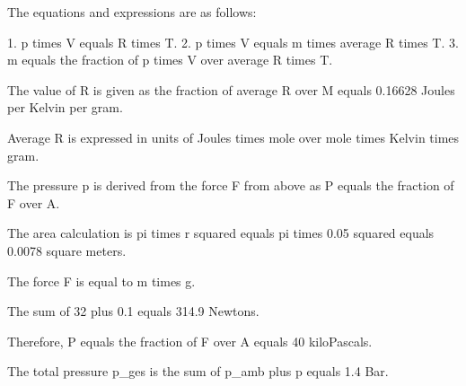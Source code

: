 The equations and expressions are as follows:

1. p times V equals R times T.
2. p times V equals m times average R times T.
3. m equals the fraction of p times V over average R times T.

The value of R is given as the fraction of average R over M equals 0.16628 Joules per Kelvin per gram.

Average R is expressed in units of Joules times mole over mole times Kelvin times gram.

The pressure p is derived from the force F from above as P equals the fraction of F over A.

The area calculation is pi times r squared equals pi times 0.05 squared equals 0.0078 square meters.

The force F is equal to m times g.

The sum of 32 plus 0.1 equals 314.9 Newtons.

Therefore, P equals the fraction of F over A equals 40 kiloPascals.

The total pressure p_ges is the sum of p_amb plus p equals 1.4 Bar.